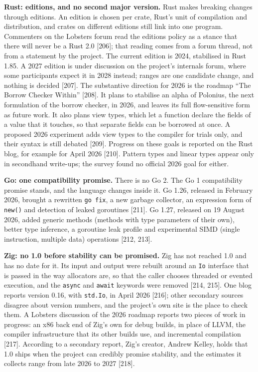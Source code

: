 \documentclass[10pt,letterpaper]{article}
\begin{document}
\textbf{Rust: editions, and no second major version.} Rust makes
breaking changes through editions. An edition is chosen per crate,
Rust's unit of compilation and distribution, and crates on different
editions still link into one program. Commenters on the Lobsters forum
read the editions policy as a stance that there will never be a Rust 2.0
{[}206{]}; that reading comes from a forum thread, not from a statement
by the project. The current edition is 2024, stabilised in Rust 1.85. A
2027 edition is under discussion on the project's internals forum, where
some participants expect it in 2028 instead; ranges are one candidate
change, and nothing is decided {[}207{]}. The substantive direction for
2026 is the roadmap ``The Borrow Checker Within'' {[}208{]}. It plans to
stabilise an alpha of Polonius, the next formulation of the borrow
checker, in 2026, and leaves its full flow-sensitive form as future
work. It also plans view types, which let a function declare the fields
of a value that it touches, so that separate fields can be borrowed at
once. A proposed 2026 experiment adds view types to the compiler for
trials only, and their syntax is still debated {[}209{]}. Progress on
these goals is reported on the Rust blog, for example for April 2026
{[}210{]}. Pattern types and linear types appear only in secondhand
write-ups; the survey found no official 2026 goal for either.

\textbf{Go: one compatibility promise.} There is no Go 2. The Go 1
compatibility promise stands, and the language changes inside it. Go
1.26, released in February 2026, brought a rewritten \texttt{go\ fix}, a
new garbage collector, an expression form of \texttt{new()} and
detection of leaked goroutines {[}211{]}. Go 1.27, released on 19 August
2026, added generic methods (methods with type parameters of their own),
better type inference, a goroutine leak profile and experimental SIMD
(single instruction, multiple data) operations {[}212, 213{]}.

\textbf{Zig: no 1.0 before stability can be promised.} Zig has not
reached 1.0 and has no date for it. Its input and output were rebuilt
around an \texttt{Io} interface that is passed in the way allocators
are, so that the caller chooses threaded or evented execution, and the
\texttt{async} and \texttt{await} keywords were removed {[}214, 215{]}.
One blog reports version 0.16, with \texttt{std.Io}, in April 2026
{[}216{]}; other secondary sources disagree about version numbers, and
the project's own site is the place to check them. A Lobsters discussion
of the 2026 roadmap reports two pieces of work in progress: an x86 back
end of Zig's own for debug builds, in place of LLVM, the compiler
infrastructure that its other builds use, and incremental compilation
{[}217{]}. According to a secondary report, Zig's creator, Andrew
Kelley, holds that 1.0 ships when the project can credibly promise
stability, and the estimates it collects range from late 2026 to 2027
{[}218{]}.
\end{document}
